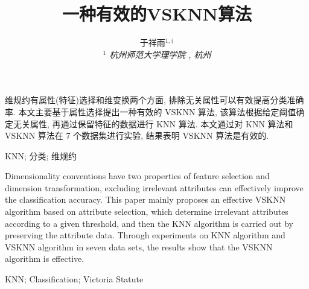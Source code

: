 \documentclass[11pt]{article}
\renewcommand{\thefootnote}{\ding{73}}
\numberwithin{equation}{section}
\begin{document}

\title{一种有效的VSKNN算法}

\author{
于祥雨$^{1,\dag}$ %
\\{\small \it $^1$ 杭州师范大学理学院 , 杭州 }
}

\rnew{\thefootnote}{\fnsymbol{footnote}}



\date{}


\maketitle
\begin{abstract1}
维规约有属性(特征)选择和维变换两个方面, 排除无关属性可以有效提高分类准确率. 本文主要基于属性选择提出一种有效的 VSKNN 算法, 
该算法根据给定阈值确定无关属性, 再通过保留特征的数据进行 KNN 算法. 本文通过对 KNN 算法和 VSKNN 算法在 7 个数据集进行实验, 结果表明 VSKNN 算法是有效的.
\end{abstract1}

\begin{keywords}
KNN; 分类; 维规约
\end{keywords}


\begin{abst}
Dimensionality conventions have two properties of feature selection and dimension transformation, excluding irrelevant attributes can effectively improve the classification accuracy. This paper mainly proposes an effective VSKNN algorithm based on attribute selection, which determine irrelevant attributes according to a given threshold, and then the KNN algorithm is carried out by preserving the attribute data. Through experiments on KNN algorithm and VSKNN algorithm in seven data sets, the results show that the VSKNN algorithm is effective.
\end{abst}

\begin{keys}
KNN; Classification; Victoria Statute
\end{keys}
\end{document}
